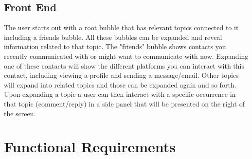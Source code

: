 \documentclass[hidelinks,english]{article}
\begin{document}
		\subsection{Front End}
		The user starts out with a root bubble that has relevant topics connected to it including a friends bubble. All these bubbles can be expanded and reveal information related to that topic. The "friends" bubble shows contacts you recently communicated with or might want to communicate with now. Expanding one of these contacts will show the different platforms you can interact with this contact, including viewing a profile and sending a message/email. Other topics will expand into related topics and those can be expanded again and so forth. Upon expanding a topic a user can then interact with a specific occurrence in that topic (comment/reply) in a side panel that will be presented on the right of the screen.
	
	\section{Functional Requirements}		
\end{document}
